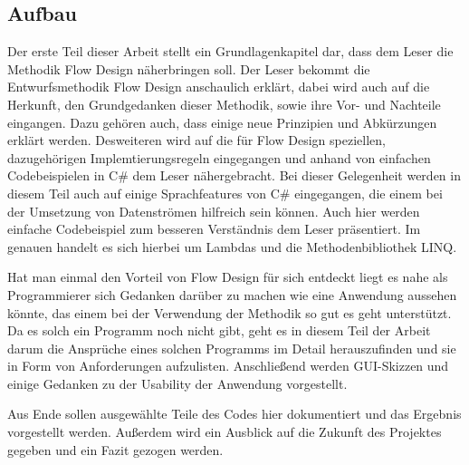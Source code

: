 \subsection{Aufbau}

Der erste Teil dieser Arbeit stellt ein Grundlagenkapitel dar, dass dem Leser die Methodik Flow Design näherbringen soll.
Der Leser bekommt die Entwurfsmethodik Flow Design anschaulich erklärt, dabei wird auch auf die Herkunft,
den Grundgedanken dieser Methodik, sowie ihre Vor- und Nachteile eingangen.
Dazu gehören auch, dass einige neue Prinzipien und Abkürzungen erklärt werden.
Desweiteren wird auf die für Flow Design speziellen, dazugehörigen Implemtierungsregeln eingegangen und
anhand von einfachen Codebeispielen in C\# dem Leser nähergebracht. 
Bei dieser Gelegenheit werden in diesem Teil auch auf einige Sprachfeatures 
von C\# eingegangen, die einem bei der Umsetzung von Datenströmen hilfreich sein
können. Auch hier werden einfache Codebeispiel zum besseren Verständnis dem Leser 
präsentiert. Im genauen handelt es sich hierbei um Lambdas und die Methodenbibliothek LINQ.

Hat man einmal den Vorteil von Flow Design für sich entdeckt liegt es nahe als
Programmierer sich Gedanken darüber zu machen wie eine Anwendung aussehen
könnte, das einem bei der Verwendung der Methodik so gut es geht unterstützt.
Da es solch ein Programm noch nicht gibt, geht es in diesem Teil der Arbeit
darum die Ansprüche eines solchen Programms im Detail herauszufinden und sie
in Form von Anforderungen aufzulisten. Anschließend werden GUI-Skizzen
und einige Gedanken zu der Usability der Anwendung vorgestellt. 

Aus Ende sollen ausgewählte Teile des Codes hier dokumentiert und das Ergebnis vorgestellt werden.
Außerdem wird ein Ausblick auf die Zukunft des Projektes gegeben und ein Fazit gezogen werden.


